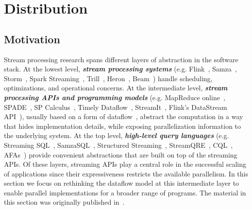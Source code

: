 \chapter{Distribution}
\label{cha:distribution}

\section{Motivation}

Stream processing research spans different layers of abstraction
in the software stack.  At the lowest level, \textbf{\emph{stream
  processing systems}} (e.g.  Flink~\cite{carbone2015flink},
Samza~\cite{Samza2017}, Storm~\cite{Storm}, Spark
Streaming~\cite{DStreams2013}, Trill~\cite{chandramouli2014trill},
Heron~\cite{kulkarni2015twitter-heron},
Beam~\cite{Beam})
handle scheduling, optimizations, and
operational concerns. At the intermediate level, \textbf{\emph{stream processing APIs and programming models}}
(e.g. MapReduce online~\cite{condie2010mapreduce}, SPADE~\cite{gedik2008spade}, SP Calculus~\cite{soule2010universal}, Timely Dataflow~\cite{Timely,murray2013naiad}, StreamIt~\cite{thies2002streamit}, Flink's DataStream API~\cite{Flink}),
usually based on a form of
dataflow~\cite{gilles1974semantics,lee1987synchronous}, abstract the
computation in a way that hides implementation details, while exposing
parallelization information to the underlying system. At the top level, \textbf{\emph{high-level query languages}}
(e.g. Streaming SQL~\cite{jain2008towards,begoli2019one}, SamzaSQL~\cite{pathirage2016samzasql}, Structured Streaming~\cite{armbrust2018structured}, StreamQRE~\cite{mamouras2017streamqre}, CQL~\cite{CQL}, AFAs~\cite{chandramouli2010high})
provide convenient abstractions that are built on top of the streaming APIs.
Of these layers, streaming APIs play a central role in the
successful scaling of applications since their expressiveness restricts
the  available parallelism.  In this section we focus on
rethinking the dataflow model at this intermediate layer to enable
parallel implementations for a broader range of programs.
The material in this section was originally published in~.


